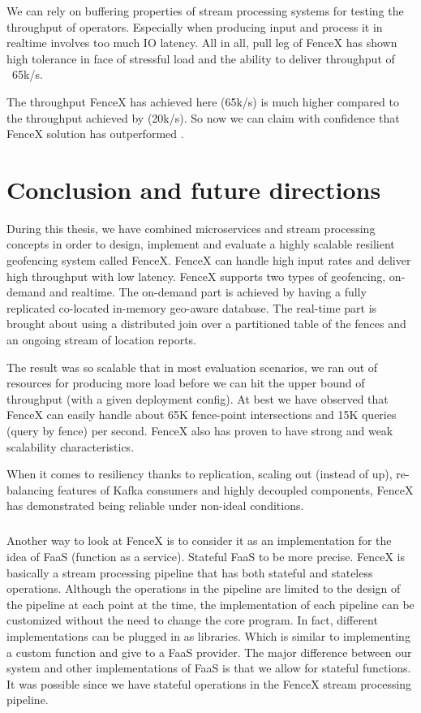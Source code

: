 \documentclass[a4]{report}
\begin{document}
    We can rely on buffering properties of stream processing systems for testing the throughput of operators.
    Especially when producing input and process it in realtime involves too much IO latency.
    All in all, pull leg of FenceX has shown high tolerance in face of stressful load and the ability to deliver throughput of ~65k/s.

    The throughput FenceX has achieved here (65k/s) is much higher compared to the throughput achieved by
    \cite{Nechifor_Comnac_2013} (20k/s).
    So now we can claim with confidence that FenceX solution has outperformed \cite{Nechifor_Comnac_2013}.

    \clearpage


    \chapter{Conclusion and future directions}
    During this thesis, we have combined microservices and stream processing concepts in order to design, implement
    and evaluate a highly scalable resilient geofencing system called FenceX.
    FenceX can handle high input rates and deliver high throughput with low latency.
    FenceX supports two types of geofencing, on-demand and realtime.
    The on-demand part is achieved by having a fully replicated co-located in-memory geo-aware database.
    The real-time part is brought about using a distributed join over a partitioned table of the fences and an ongoing stream of location reports.

    The result was so scalable that in most evaluation scenarios, we ran out of resources for producing more load
    before we can hit the upper bound of throughput (with a given deployment config).
    At best we have observed that FenceX can easily handle about 65K fence-point intersections and 15K queries (query by
    fence) per second.
    FenceX also has proven to have strong and weak scalability characteristics.

    When it comes to resiliency thanks to replication, scaling out (instead of up), re-balancing features of Kafka
    consumers and highly decoupled components, FenceX has demonstrated being reliable under non-ideal conditions.

    \paragraph{}
    Another way to look at FenceX is to consider it as an implementation for the idea of FaaS (function as a service).
    Stateful FaaS to be more precise.
    FenceX is basically a stream processing pipeline that has both stateful and stateless operations.
    Although the operations in the pipeline are limited to the design of the pipeline at each point at the time, the implementation of each pipeline can be customized without the need to change the core program.
    In fact, different implementations can be plugged in as libraries.
    Which is similar to implementing a custom function and give to a FaaS provider.
    The major difference between our system and other implementations of FaaS is that we allow for stateful functions.
    It was possible since we have stateful operations in the FenceX stream processing pipeline.
\end{document}
